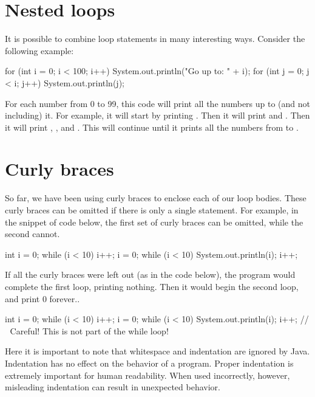 \section{Nested loops}
It is possible to combine loop statements in many interesting ways. Consider the following example:

\begin{code}
for (int i = 0; i < 100; i++)
{
    System.out.println("Go up to: " + i);
    for (int j = 0; j < i; j++)
    {
        System.out.println(j);
    }
}
\end{code}

\noindent For each number from 0 to 99, this code will print all the numbers up
to (and not including) it.  For example, it will start by printing . Then it will print 
and .  Then it will print , , and .  This will continue
until it prints all the numbers from  to .

\section{Curly braces}
So far, we have been using curly braces to enclose each of our loop bodies. These curly braces can be omitted if there is only a single statement. For example, in the snippet of code below, the first set of curly braces can be omitted, while the second cannot.

\begin{code}
int i = 0;
while (i < 10)
{
    i++;
}
i = 0;
while (i < 10)
{
    System.out.println(i);
    i++;
}
\end{code}

\noindent If all the curly braces were left out (as in the code below), the
program would complete the first loop, printing nothing. Then it would begin the
second loop, and print 0 forever..

\begin{code}
int i = 0;
while (i < 10)
    i++;
i = 0;
while (i < 10)
    System.out.println(i);
    i++;
// ^^^ Careful! This is not part of the while loop!
\end{code}

Here it is important to note that whitespace and indentation are ignored by Java. Indentation has no effect on the behavior of a program. Proper indentation is extremely important for human readability. When used incorrectly, however, misleading indentation can result in unexpected behavior.

\exercisesection

